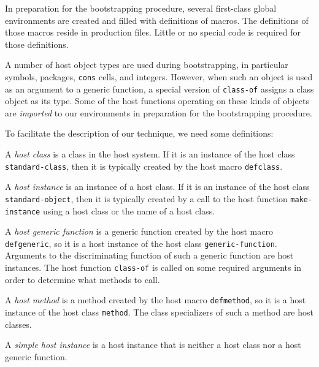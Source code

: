 In preparation for the bootstrapping procedure, several first-class
global environments are created and filled with definitions of \sicl{}
macros.  The definitions of those macros reside in production \sicl{}
files.  Little or no special code is required for those definitions.

A number of host object types are used during bootstrapping, in
particular symbols, packages, \texttt{cons} cells, and integers.
However, when such an object is used as an argument to a \sicl{}
generic function, a special version of \texttt{class-of} assigns a
\sicl{} class object as its type.  Some of the host functions
operating on these kinds of objects are \emph{imported} to our
environments in preparation for the bootstrapping procedure.

To facilitate the description of our technique, we need some
definitions:

\begin{definition}
A \emph{host class} is a class in the host system.  If it is an
instance of the host class \texttt{standard-class}, then it is
typically created by the host macro \texttt{defclass}.
\end{definition}

\begin{definition}
A \emph{host instance} is an instance of a host class.  If it is an
instance of the host class \texttt{standard-object}, then it is
typically created by a call to the host function
\texttt{make-instance} using a host class or the name of a host class.
\end{definition}

\begin{definition}
A \emph{host generic function} is a generic function created by the
host macro \texttt{defgeneric}, so it is a host instance of the host
class \texttt{generic-function}.  Arguments to the discriminating
function of such a generic function are host instances.  The host
function \texttt{class-of} is called on some required arguments in
order to determine what methods to call.
\end{definition}

\begin{definition}
A \emph{host method} is a method created by the host macro
\texttt{defmethod}, so it is a host instance of the host class
\texttt{method}.  The class specializers of such a method are host
classes.
\end{definition}

\begin{definition}
A \emph{simple host instance} is a host instance that is neither a
host class nor a host generic function.
\end{definition}

